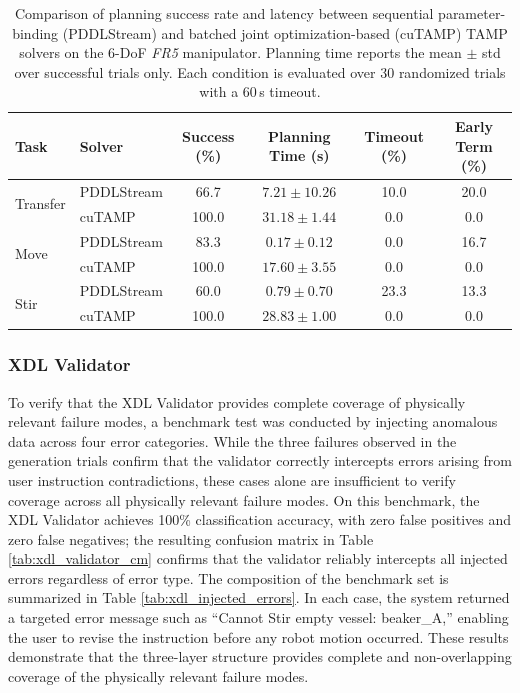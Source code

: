 \documentclass{ieeeaccess}
\begin{document}
\begin{table}[t]
\caption{Comparison of planning success rate and latency between sequential parameter-binding (PDDLStream) and batched joint optimization-based (cuTAMP) TAMP solvers on the 6-DoF \textit{FR5} manipulator. Planning time reports the mean $\pm$ std over successful trials only. Each condition is evaluated over 30 randomized trials with a 60\,s timeout.}
\label{tab:tamp_comparison}
\centering
\begin{tabular*}{\linewidth}{@{\extracolsep{\fill}}llcccc@{}}
\toprule
Task & Solver & Success (\%) & Planning Time (s) & Timeout (\%) & Early Term (\%) \\
\midrule
\multirow{2}{*}{Transfer}
 & PDDLStream & 66.7 & $7.21 \pm 10.26$ & 10.0 & 20.0 \\
 & cuTAMP     & 100.0 & $31.18 \pm 1.44$ & 0.0  & 0.0  \\
\midrule
\multirow{2}{*}{Move}
 & PDDLStream & 83.3 & $0.17 \pm 0.12$ & 0.0  & 16.7 \\
 & cuTAMP     & 100.0 & $17.60 \pm 3.55$ & 0.0 & 0.0  \\
\midrule
\multirow{2}{*}{Stir}
 & PDDLStream & 60.0 & $0.79 \pm 0.70$ & 23.3 & 13.3 \\
 & cuTAMP     & 100.0 & $28.83 \pm 1.00$ & 0.0 & 0.0  \\
\bottomrule
\end{tabular*}
\end{table}



\subsubsection{XDL Validator}\label{sec:4.2.2}
To verify that the XDL Validator provides complete coverage of physically relevant failure modes, a benchmark test was conducted by injecting anomalous data across four error categories. While the three failures observed in the generation trials confirm that the validator correctly intercepts errors arising from user instruction contradictions, these cases alone are insufficient to verify coverage across all physically relevant failure modes. On this benchmark, the XDL Validator achieves 100\% classification accuracy, with zero false positives and zero false negatives; the resulting confusion matrix in Table \ref{tab:xdl_validator_cm} confirms that the validator reliably intercepts all injected errors regardless of error type. The composition of the benchmark set is summarized in Table \ref{tab:xdl_injected_errors}. In each case, the system returned a targeted error message such as ``Cannot Stir empty vessel: beaker\_A,'' enabling the user to revise the instruction before any robot motion occurred. These results demonstrate that the three-layer structure provides complete and non-overlapping coverage of the physically relevant failure modes.
\end{document}

